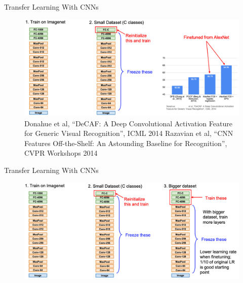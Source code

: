 \documentclass[serif, aspectratio=169]{beamer}
\begin{document}
\begin{frame}{Transfer Learning With CNNs}
	\begin{figure}[htpb]
		\begin{center}
			\includegraphics[keepaspectratio, scale=0.25]{pic/TL_cnn}
			\caption*{\scriptsize Donahue et al, “DeCAF: A Deep Convolutional Activation Feature for Generic Visual Recognition”, ICML 2014 \newline Razavian et al, “CNN Features Off-the-Shelf: An Astounding Baseline for Recognition”, CVPR Workshops 2014}
		\end{center}
	\end{figure}
\end{frame}

\begin{frame}{Transfer Learning With CNNs}
	\begin{figure}[htpb]
		\begin{center}
			\includegraphics[keepaspectratio, scale=0.25]{pic/TL_cnn2}
		\end{center}
	\end{figure}
\end{frame}
\end{document}
